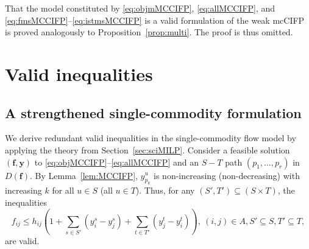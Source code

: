 \documentclass[pdflatex,sn-mathphys-num]{sn-jnl}%
\theoremstyle{thmstyleone}%
\begin{document}
That the model constituted by \eqref{eq:objmMCCIFP}, \eqref{eq:allMCCIFP}, and \eqref{eq:fmsMCCIFP}--\eqref{eq:istmsMCCIFP} is a valid formulation of the weak mcCIFP is proved analogously to Proposition~\ref{prop:multi}. The proof is thus omitted.

\section{Valid inequalities} \label{sec:vi}
\subsection{A strengthened single-commodity formulation} \label{sec:vis}
We derive redundant valid inequalities in the single-commodity flow model by applying the theory from Section~\ref{sec:sciMILP}.
Consider a feasible solution $(\boldsymbol{f},\boldsymbol{y})$ to \eqref{eq:objMCCIFP}--\eqref{eq:allMCCIFP} and an $S-T$ path $(p_1,\ldots,p_r)$ in $D(\boldsymbol{f})$. By Lemma~\ref{lem:MCCIFP}, $y_{p_k}^u$ is non-increasing (non-decreasing) with increasing $k$ for all $u\in S$ (all $u\in T$).
Thus, for any $(S',T')\subseteq(S\times T)$, the inequalities
\begin{equation}
	\displaystyle{f_{ij}\leq h_{ij}\left(1+\sum_{s\in S'}(y_i^s-y_j^s) + \sum_{t\in T'}(y_j^t-y_i^t)\right)}, ~(i,j)\in A, S'\subseteq S, T'\subseteq T, \label{eq:vistMCCIFP}
\end{equation}
\noindent
are valid.
\end{document}
